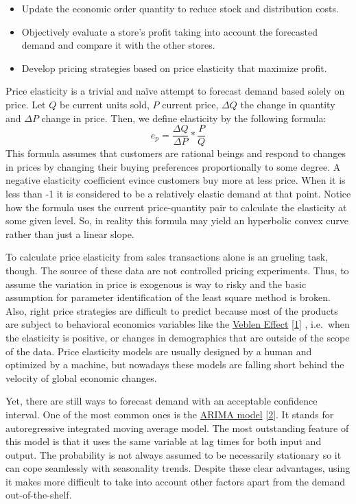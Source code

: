 \documentclass[]{article}
\providecommand{\tightlist}{%
  \setlength{\itemsep}{0pt}\setlength{\parskip}{0pt}}
\theoremstyle{definition}
\theoremstyle{definition}
\theoremstyle{definition}
\theoremstyle{remark}
\begin{document}
\begin{itemize}
\tightlist
\item
  Update the economic order quantity to reduce stock and distribution
  costs.
\item
  Objectively evaluate a store's profit taking into account the
  forecasted demand and compare it with the other stores.
\item
  Develop pricing strategies based on price elasticity that maximize
  profit.
\end{itemize}

Price elasticity is a trivial and naïve attempt to forecast demand based
solely on price. Let \(Q\) be current units sold, \(P\) current price,
\(\Delta Q\) the change in quantity and \(\Delta P\) change in price.
Then, we define elasticity by the following formula: \[
e_p=\frac{\Delta Q}{\Delta P}*\frac{P}{Q}
\] This formula assumes that customers are rational beings and respond
to changes in prices by changing their buying preferences proportionally
to some degree. A negative elasticity coefficient evince customers buy
more at less price. When it is less than -1 it is considered to be a
relatively elastic demand at that point. Notice how the formula uses the
current price-quantity pair to calculate the elasticity at some given
level. So, in reality this formula may yield an hyperbolic convex curve
rather than just a linear slope.

To calculate price elasticity from sales transactions alone is an
grueling task, though. The source of these data are not controlled
pricing experiments. Thus, to assume the variation in price is exogenous
is way to risky and the basic assumption for parameter identification of
the least square method is broken. Also, right price strategies are
difficult to predict because most of the products are subject to
behavioral economics variables like the
\href{https://en.wikipedia.org/wiki/Veblen_good}{Veblen Effect}
{[}\protect\hyperlink{ref-Veblen}{1}{]} , i.e.~when the elasticity is
positive, or changes in demographics that are outside of the scope of
the data. Price elasticity models are usually designed by a human and
optimized by a machine, but nowadays these models are falling short
behind the velocity of global economic changes.

Yet, there are still ways to forecast demand with an acceptable
confidence interval. One of the most common ones is the
\href{https://en.wikipedia.org/wiki/Autoregressive_integrated_moving_average}{ARIMA
model} {[}\protect\hyperlink{ref-Hyndman}{2}{]}. It stands for
autoregressive integrated moving average model. The most outstanding
feature of this model is that it uses the same variable at lag times for
both input and output. The probability is not always assumed to be
necessarily stationary so it can cope seamlessly with seasonality
trends. Despite these clear advantages, using it makes more difficult to
take into account other factors apart from the demand out-of-the-shelf.
\end{document}
